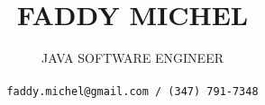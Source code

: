 \title{
\uppercase{Faddy Michel}
}

\author{
\uppercase{Java Software Engineer}\\ \\
\texttt{faddy.michel@gmail.com / (347) 791-7348}
}

\date{}

\maketitle
